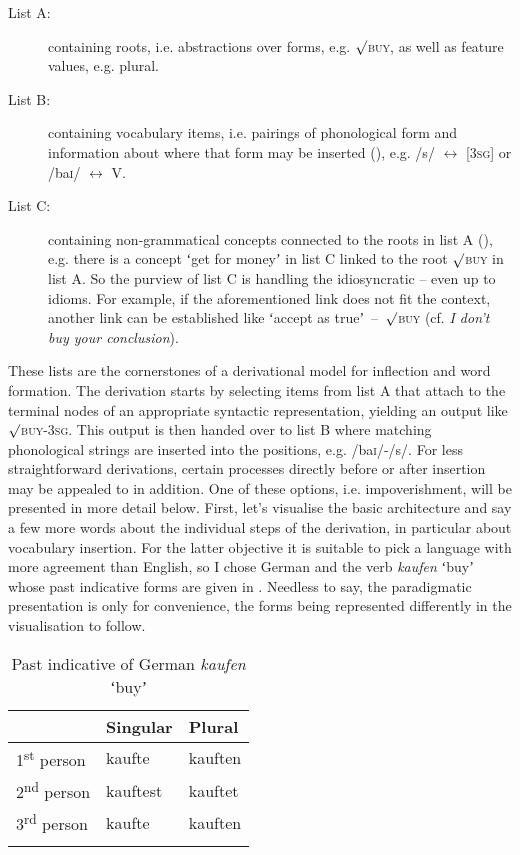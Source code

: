 \documentclass[output=paper]{langsci/langscibook}
\begin{document}
\begin{description}
\item[List A:] containing roots, i.e. abstractions over forms, e.g. ${\surd}$\textsc{buy}, as well as feature values, e.g. plural.
\item[List B:] containing vocabulary items, i.e. pairings of phonological form and information about where that form may be inserted (\citealt[4]{HarleyHarley1999}), e.g. /s/ $\leftrightarrow $ [3\textsc{sg}] or /ba\textsc{i/} $\leftrightarrow $ V.
\item[List C:] containing non-grammatical concepts connected to the roots in list A (\citealt[209--210]{Embick2015}), e.g. there is a concept ʻget for moneyʼ in list C linked to the root ${\surd}$\textsc{buy} in list A. So the purview of list C is handling the idiosyncratic – even up to idioms. For example, if the aforementioned link does not fit the context, another link can be established like ʻaccept as trueʼ~–~${\surd}$\textsc{buy} (cf. \textit{I don’t buy your conclusion}).
\end{description}

These lists are the cornerstones of a derivational model for inflection and word formation. The derivation starts by selecting items from list A that attach to the terminal nodes of an appropriate syntactic representation, yielding an output like ${\surd}$\textsc{buy}-3\textsc{sg}. This output is then handed over to list B where matching phonological strings are inserted into the positions, e.g. /ba\textsc{i}/-/s/. For less straightforward derivations, certain processes directly before or after insertion may be appealed to in addition. One of these options, i.e. impoverishment, will be presented in more detail below. First, let’s visualise the basic architecture and say a few more words about the individual steps of the derivation, in particular about vocabulary insertion. For the latter objective it is suitable to pick a language with more agreement than English, so I chose German and the verb \textit{kaufen} ʻbuyʼ whose past indicative forms are given in . Needless to say, the paradigmatic presentation is only for convenience, the forms being represented differently in the visualisation to follow.\largerpage[1.5]

\begin{table}
\caption{Past indicative of German \textit{kaufen} ʻbuyʼ \citep[23]{HelbigHelbig2001}\label{tab:reiner:5}}
\begin{tabular}{lll}
\lsptoprule
 & Singular & Plural\\\midrule
1\textsuperscript{st} person & kaufte & kauften\\
2\textsuperscript{nd} person & kauftest & kauftet\\
3\textsuperscript{rd} person & kaufte & kauften\\
\lspbottomrule
\end{tabular}
\end{table}
\end{document}
